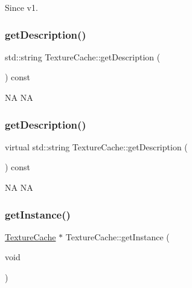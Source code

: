 \begin{DoxySince}{Since}
v1. 
\end{DoxySince}
\mbox{\label{classTextureCache_a1e54c198c9f9a242c0fe8989b494f1a1}} 
\subsubsection{\texorpdfstring{get\+Description()}{getDescription()}\hspace{0.1cm}{\footnotesize\ttfamily [1/2]}}
{\footnotesize\ttfamily std\+::string Texture\+Cache\+::get\+Description (\begin{DoxyParamCaption}{ }\end{DoxyParamCaption}) const\hspace{0.3cm}{\ttfamily [virtual]}}

NA  NA \mbox{\label{classTextureCache_a1e4fd2c1e7bf821300b2bf23e6c70561}} 
\subsubsection{\texorpdfstring{get\+Description()}{getDescription()}\hspace{0.1cm}{\footnotesize\ttfamily [2/2]}}
{\footnotesize\ttfamily virtual std\+::string Texture\+Cache\+::get\+Description (\begin{DoxyParamCaption}{ }\end{DoxyParamCaption}) const\hspace{0.3cm}{\ttfamily [virtual]}}

NA  NA \mbox{\label{classTextureCache_aedd5e47ab3b453d894eab82ae18d80af}} 
\subsubsection{\texorpdfstring{get\+Instance()}{getInstance()}\hspace{0.1cm}{\footnotesize\ttfamily [1/2]}}
{\footnotesize\ttfamily \hyperlink{classTextureCache}{Texture\+Cache} $\ast$ Texture\+Cache\+::get\+Instance (\begin{DoxyParamCaption}\item[{void}]{ }\end{DoxyParamCaption})\hspace{0.3cm}{\ttfamily [static]}}

